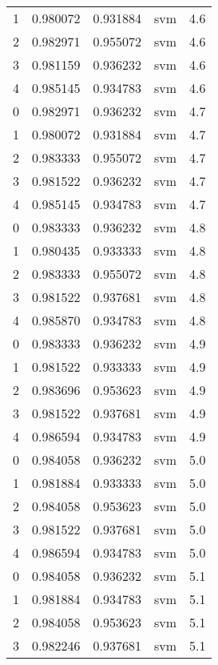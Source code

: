 \begin{tabular}{rrrlr}
     1 & 0.980072 & 0.931884 &      svm &        4.6 \\
     2 & 0.982971 & 0.955072 &      svm &        4.6 \\
     3 & 0.981159 & 0.936232 &      svm &        4.6 \\
     4 & 0.985145 & 0.934783 &      svm &        4.6 \\
     0 & 0.982971 & 0.936232 &      svm &        4.7 \\
     1 & 0.980072 & 0.931884 &      svm &        4.7 \\
     2 & 0.983333 & 0.955072 &      svm &        4.7 \\
     3 & 0.981522 & 0.936232 &      svm &        4.7 \\
     4 & 0.985145 & 0.934783 &      svm &        4.7 \\
     0 & 0.983333 & 0.936232 &      svm &        4.8 \\
     1 & 0.980435 & 0.933333 &      svm &        4.8 \\
     2 & 0.983333 & 0.955072 &      svm &        4.8 \\
     3 & 0.981522 & 0.937681 &      svm &        4.8 \\
     4 & 0.985870 & 0.934783 &      svm &        4.8 \\
     0 & 0.983333 & 0.936232 &      svm &        4.9 \\
     1 & 0.981522 & 0.933333 &      svm &        4.9 \\
     2 & 0.983696 & 0.953623 &      svm &        4.9 \\
     3 & 0.981522 & 0.937681 &      svm &        4.9 \\
     4 & 0.986594 & 0.934783 &      svm &        4.9 \\
     0 & 0.984058 & 0.936232 &      svm &        5.0 \\
     1 & 0.981884 & 0.933333 &      svm &        5.0 \\
     2 & 0.984058 & 0.953623 &      svm &        5.0 \\
     3 & 0.981522 & 0.937681 &      svm &        5.0 \\
     4 & 0.986594 & 0.934783 &      svm &        5.0 \\
     0 & 0.984058 & 0.936232 &      svm &        5.1 \\
     1 & 0.981884 & 0.934783 &      svm &        5.1 \\
     2 & 0.984058 & 0.953623 &      svm &        5.1 \\
     3 & 0.982246 & 0.937681 &      svm &        5.1 \\

\end{tabular}
